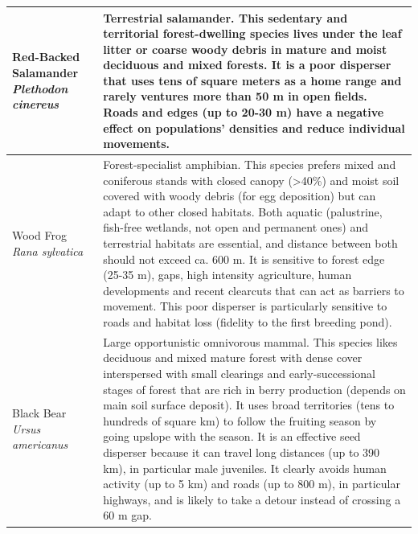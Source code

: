 \begin{longtable}[c]{|p{5cm}|p{11cm}|}
Red-Backed Salamander \newline \textit{Plethodon cinereus} & Terrestrial salamander. This sedentary and territorial forest-dwelling species lives under the leaf litter or coarse woody debris in mature and moist deciduous and mixed forests. It is a poor disperser that uses tens of square meters as a home range and rarely ventures more than 50 m in open fields. Roads and edges (up to 20-30 m) have a negative effect on populations’ densities and reduce individual movements. \\ \hline
Wood Frog \newline \textit{Rana sylvatica} & Forest-specialist amphibian. This species prefers mixed and coniferous stands with closed canopy (\textgreater 40\%) and moist soil covered with woody debris (for egg deposition) but can adapt to other closed habitats. Both aquatic (palustrine, fish-free wetlands, not open and permanent ones) and terrestrial habitats are essential, and distance between both should not exceed ca. 600 m. It is sensitive to forest edge (25-35 m), gaps, high intensity agriculture, human developments and recent clearcuts that can act as barriers to movement. This poor disperser is particularly sensitive to roads and habitat loss (fidelity to the first breeding pond). \\ \hline
Black Bear \newline \textit{Ursus americanus} & Large opportunistic omnivorous mammal. This species likes deciduous and mixed mature forest with dense cover interspersed with small clearings and early-successional stages of forest that are rich in berry production (depends on main soil surface deposit). It uses broad territories (tens to hundreds of square km) to follow the fruiting season by going upslope with the season. It is an effective seed disperser because it can travel long distances (up to 390 km), in particular male juveniles. It clearly avoids human activity (up to 5 km) and roads (up to 800 m), in particular highways, and is likely to take a detour instead of crossing a 60 m gap. \\
\hline
\hline
\end{longtable}




